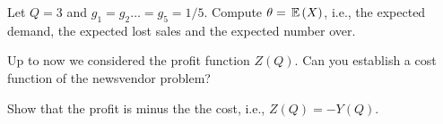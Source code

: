 \begin{exercise}
  Let $Q=3$ and $g_1=g_2\ldots=g_5 = 1/5$. Compute $\theta = \,\mathbb{E}\,(X)$, i.e., the expected demand, the expected lost sales and the expected number over.

\end{exercise}

\begin{exercise}
  Up to now we considered the profit function $Z(Q)$.  Can you
  establish a cost function of the newsvendor problem?

\end{exercise}


\begin{exercise}
  Show that the profit is minus the the cost, i.e., $Z(Q) = -Y(Q)$.

\end{exercise}

